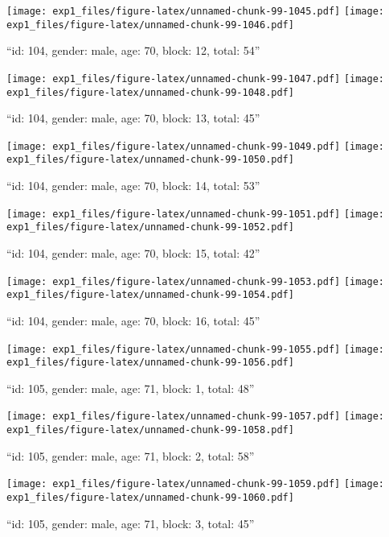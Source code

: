 \documentclass[,]{article}
\begin{document}
\texttt{[image: exp1\_files/figure-latex/unnamed-chunk-99-1045.pdf]}
\texttt{[image: exp1\_files/figure-latex/unnamed-chunk-99-1046.pdf]}

\newpage
[1] 

``id: 104, gender: male, age: 70, block: 12, total: 54''

\texttt{[image: exp1\_files/figure-latex/unnamed-chunk-99-1047.pdf]}
\texttt{[image: exp1\_files/figure-latex/unnamed-chunk-99-1048.pdf]}

\newpage
[1] 

``id: 104, gender: male, age: 70, block: 13, total: 45''

\texttt{[image: exp1\_files/figure-latex/unnamed-chunk-99-1049.pdf]}
\texttt{[image: exp1\_files/figure-latex/unnamed-chunk-99-1050.pdf]}

\newpage
[1] 

``id: 104, gender: male, age: 70, block: 14, total: 53''

\texttt{[image: exp1\_files/figure-latex/unnamed-chunk-99-1051.pdf]}
\texttt{[image: exp1\_files/figure-latex/unnamed-chunk-99-1052.pdf]}

\newpage
[1] 

``id: 104, gender: male, age: 70, block: 15, total: 42''

\texttt{[image: exp1\_files/figure-latex/unnamed-chunk-99-1053.pdf]}
\texttt{[image: exp1\_files/figure-latex/unnamed-chunk-99-1054.pdf]}

\newpage
[1] 

``id: 104, gender: male, age: 70, block: 16, total: 45''

\texttt{[image: exp1\_files/figure-latex/unnamed-chunk-99-1055.pdf]}
\texttt{[image: exp1\_files/figure-latex/unnamed-chunk-99-1056.pdf]}

\newpage
[1] 

``id: 105, gender: male, age: 71, block: 1, total: 48''

\texttt{[image: exp1\_files/figure-latex/unnamed-chunk-99-1057.pdf]}
\texttt{[image: exp1\_files/figure-latex/unnamed-chunk-99-1058.pdf]}

\newpage
[1] 

``id: 105, gender: male, age: 71, block: 2, total: 58''

\texttt{[image: exp1\_files/figure-latex/unnamed-chunk-99-1059.pdf]}
\texttt{[image: exp1\_files/figure-latex/unnamed-chunk-99-1060.pdf]}

\newpage
[1] 

``id: 105, gender: male, age: 71, block: 3, total: 45''
\end{document}
